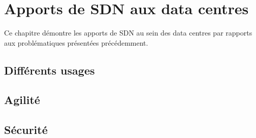 \chapter{Apports de SDN aux data centres}
Ce chapitre démontre les apports de SDN au sein des data centres par rapports aux problématiques présentées précédemment.

\section{Différents usages}

\section{Agilité}

\section{Sécurité}
